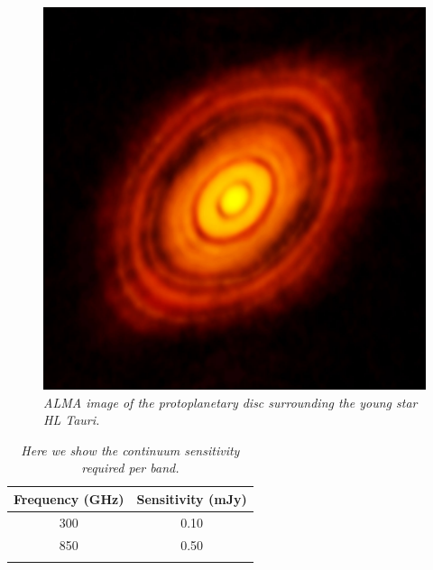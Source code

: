\documentclass[12pt,a4paper]{article}  %
\begin{document}
\begin{figure}[tbh]
\includegraphics[scale=0.2]{HL_tau.jpg}
\caption{\em{ALMA image of the protoplanetary disc surrounding the young star HL Tauri.}}
\end{figure}



\begin{table}[tbh]
\begin{center}
\caption[]{\em{Here we show the continuum sensitivity required per band.}}
\begin{tabular}{cc}
\hline \noalign {\smallskip}
Frequency (GHz) & Sensitivity (mJy) \\
\hline \noalign {\smallskip}
300 & 0.10 \\
850 & 0.50 \\
\hline \noalign {\smallskip}
\end{tabular}
\end{center}
\end{table}
\end{document}
